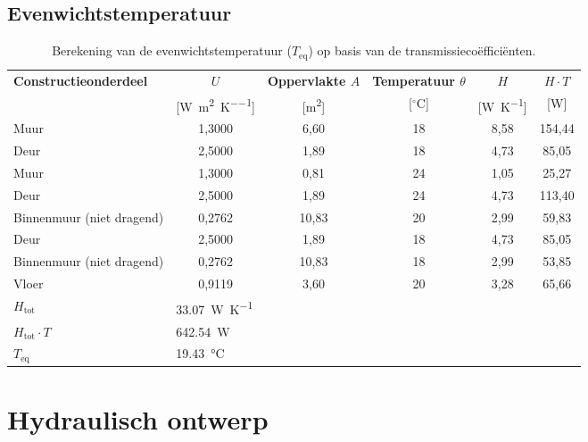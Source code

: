 \documentclass[a4paper,12pt]{article}
\begin{document}
\subsection{Evenwichtstemperatuur}

\begin{table}[H]
\centering
\small
\caption{Berekening van de evenwichtstemperatuur ($T_{\text{eq}}$) op basis van de transmissiecoëfficiënten.}
\label{tab:evenwichtstemperatuur}
\begin{tabularx}{\textwidth}{X c c c c c}
\toprule
\rowcolor{gray!20}
\textbf{Constructieonderdeel} & \textbf{$U$} & \textbf{Oppervlakte $A$} & \textbf{Temperatuur $\theta$} & \textbf{$H$} & \textbf{$H \cdot T$} \\
\rowcolor{gray!20}
& [\unit{\watt\per\square\meter\per\kelvin}] & [\unit{\square\meter}] & [$^\circ$C] & [\unit{\watt\per\kelvin}] & [\unit{\watt}] \\ \midrule
Muur                     & 1,3000 & 6,60  & 18 & 8,58 & 154,44 \\
Deur                     & 2,5000 & 1,89  & 18 & 4,73 & 85,05  \\
Muur                     & 1,3000 & 0,81  & 24 & 1,05 & 25,27  \\
Deur                     & 2,5000 & 1,89  & 24 & 4,73 & 113,40 \\
Binnenmuur (niet dragend)& 0,2762 & 10,83 & 20 & 2,99 & 59,83  \\
Deur                     & 2,5000 & 1,89  & 18 & 4,73 & 85,05  \\
Binnenmuur (niet dragend)& 0,2762 & 10,83 & 18 & 2,99 & 53,85  \\
Vloer                    & 0,9119 & 3,60  & 20 & 3,28 & 65,66  \\ \midrule
\rowcolor{gray!10}
\textbf{$H_{\text{tot}}$}   & \multicolumn{5}{l}{\qty{33,07}{\watt\per\kelvin}} \\
\rowcolor{gray!10}
\textbf{$H_{\text{tot}} \cdot T$} & \multicolumn{5}{l}{\qty{642,54}{\watt}} \\ 
\rowcolor{gray!10}
\textbf{$T_{\text{eq}}$}    & \multicolumn{5}{l}{\qty{19,43}{\celsius}} \\ \bottomrule
\end{tabularx}
\end{table}




\section{Hydraulisch ontwerp}
\end{document}
